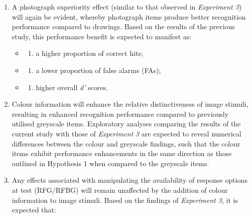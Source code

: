 \documentclass[
  11pt,
]{article}
\providecommand{\tightlist}{%
  \setlength{\itemsep}{0pt}\setlength{\parskip}{0pt}}
\begin{document}
\begin{enumerate}
\def\labelenumi{\arabic{enumi}.}
\item
  A photograph superiority effect (similar to that observed in
  \emph{Experiment 3}) will again be evident, whereby photograph items
  produce better recognition performance compared to drawings. Based on
  the results of the previous study, this performance benefit is
  expected to manifest as:

  \begin{itemize}
  \item
    \begin{enumerate}
    \def\labelenumii{\roman{enumii})}
    \tightlist
    \item
      a higher proportion of correct hits;
    \end{enumerate}
  \item
    \begin{enumerate}
    \def\labelenumii{\roman{enumii})}
    \setcounter{enumii}{1}
    \tightlist
    \item
      a lower proportion of false alarms (FAs);
    \end{enumerate}
  \item
    \begin{enumerate}
    \def\labelenumii{\roman{enumii})}
    \setcounter{enumii}{2}
    \tightlist
    \item
      higher overall \emph{d'} scores.
    \end{enumerate}
  \end{itemize}
\item
  Colour information will enhance the relative distinctiveness of image
  stimuli, resulting in enhanced recognition performance compared to
  previously utilised greyscale items. Exploratory analyses comparing
  the results of the current study with those of \emph{Experiment 3} are
  expected to reveal numerical differences between the colour and
  greyscale findings, such that the colour items exhibit performance
  enhancements in the same direction as those outlined in Hypothesis 1
  when compared to the greyscale items.
\item
  Any effects associated with manipulating the availability of response
  options at test (RFG/RFBG) will remain unaffected by the addition of
  colour information to image stimuli. Based on the findings of
  \emph{Experiment 3}, it is expected that:


\end{enumerate}
\end{document}
